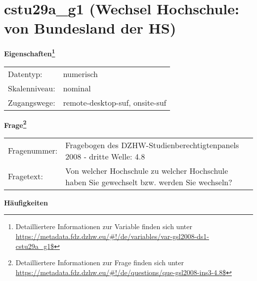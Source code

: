 
    \setcounter{footnote}{0}

    \vspace*{-1.8cm}
	\section{cstu29a\_g1 (Wechsel Hochschule: von Bundesland der HS)}
	\label{section:cstu29a_g1}



    \vspace*{0.5cm}
    \noindent\textbf{Eigenschaften\footnote{Detailliertere Informationen zur Variable finden sich unter
		\url{https://metadata.fdz.dzhw.eu/\#!/de/variables/var-gsl2008-ds1-cstu29a_g1$}}}\\
	\begin{tabularx}{\hsize}{@{}lX}
	Datentyp: & numerisch \\
	Skalenniveau: & nominal \\
	Zugangswege: &
	  remote-desktop-suf, 
	  onsite-suf
 \\
    \end{tabularx}



				\vspace*{0.5cm}
                \noindent\textbf{Frage\footnote{Detailliertere Informationen zur Frage finden sich unter
		              \url{https://metadata.fdz.dzhw.eu/\#!/de/questions/que-gsl2008-ins3-4.8$}}}\\
				\begin{tabularx}{\hsize}{@{}lX}
					Fragenummer: &
					  Fragebogen des DZHW-Studienberechtigtenpanels 2008 - dritte Welle:
					  4.8
 \\
					Fragetext: & Von welcher Hochschule zu welcher Hochschule haben Sie gewechselt bzw. werden Sie wechseln? \\
				\end{tabularx}





        		\vspace*{0.5cm}
                \noindent\textbf{Häufigkeiten}

